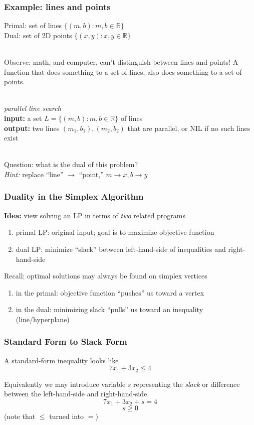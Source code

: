 \documentclass{beamer}
\newcommand{\stanza}{ \\~\ }
\begin{document}
\begin{frame} \frametitle{Example: lines and points}
Primal: set of lines $\{ (m, b) : m, b \in \mathbb{R} \}$ \\
Dual: set of 2D points $\{ (x, y) : x, y \in \mathbb{R} \}$ \stanza

Observe: math, and computer, can't distinguish between lines and points!
A function that does something to a set of lines, also does something to a set of points. \stanza

\emph{parallel line search} \\
\textbf{input:} a set $L = \{ (m, b) : m, b \in \mathbb{R} \}$ of lines \\
\textbf{output:} two lines $(m_1, b_1), (m_2, b_2)$ that are parallel, or NIL
if no such lines exist \stanza

Question: what is the dual of this problem? \\
\emph{Hint:} replace ``line'' $\rightarrow$ ``point,'' $m \rightarrow x, b \rightarrow y$
\end{frame}

\begin{frame} \frametitle{Duality in the Simplex Algorithm}
\textbf{Idea:} view solving an LP in terms of \emph{two} related programs
\begin{enumerate}
  \item primal LP: original input; goal is to maximize objective function
  \item dual LP: minimize ``slack'' between left-hand-side of inequalities and
    right-hand-side
\end{enumerate}

Recall: optimal solutions may always be found on simplex vertices
\begin{enumerate}
  \item in the primal: objective function ``pushes'' us toward a vertex
  \item in the dual: minimizing slack ``pulls'' us toward an inequality (line/hyperplane)
\end{enumerate}
\end{frame}

\begin{frame} \frametitle{Standard Form to Slack Form}
A standard-form inequality looks like
\[ 7 x_1 + 3 x_2 \leq 4 \]

Equivalently we may introduce variable $s$ representing the \emph{slack}
or difference between the left-hand-side and right-hand-side.
\[ 7 x_1 + 3 x_2 + s = 4 \]
\[ s \geq 0 \]
(note that $\leq$ turned into $=$)

\end{frame}
\end{document}
